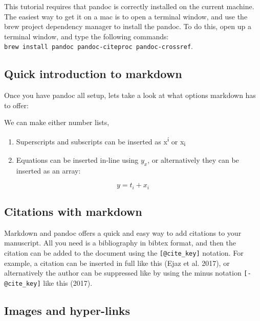 \documentclass[letterpaper,11pt,twoside,onecolumn,notitlepage]{article}
\providecommand{\tightlist}{%
  \setlength{\itemsep}{0pt}\setlength{\parskip}{0pt}}
\begin{document}
This tutorial requires that pandoc is correctly installed on the current
machine. The easiest way to get it on a mac is to open a terminal
window, and use the brew project dependency manager to install the
pandoc. To do this, open up a terminal window, and type the following
commands:
\texttt{brew\ install\ pandoc\ pandoc-citeproc\ pandoc-crossref}.

\hypertarget{quick-introduction-to-markdown}{%
\subsection{Quick introduction to
markdown}\label{quick-introduction-to-markdown}}

Once you have pandoc all setup, lets take a look at what options
markdown has to offer:

We can make either number lists,

\begin{enumerate}
\def\labelenumi{\arabic{enumi}.}
\tightlist
\item
  Superscripts and subscripts can be inserted as x\textsuperscript{i} or
  x\textsubscript{i}\\
\item
  Equations can be inserted in-line using \(y_x\), or alternatively they
  can be inserted as an array:
\end{enumerate}

\[ y = t_i + x_i  \]

\hypertarget{citations-with-markdown}{%
\subsection{Citations with markdown}\label{citations-with-markdown}}

Markdown and pandoc offers a quick and easy way to add citations to your
manuscript. All you need is a bibliography in bibtex format, and then
the citation can be added to the document using the
\texttt{{[}@cite\_key{]}} notation. For example, a citation can be
inserted in full like this (Ejaz et al. 2017), or alternatively the
author can be suppressed like by using the minus notation
\texttt{{[}-@cite\_key{]}} like this (2017).

\hypertarget{images-and-hyper-links}{%
\subsection{Images and hyper-links}\label{images-and-hyper-links}}
\end{document}
